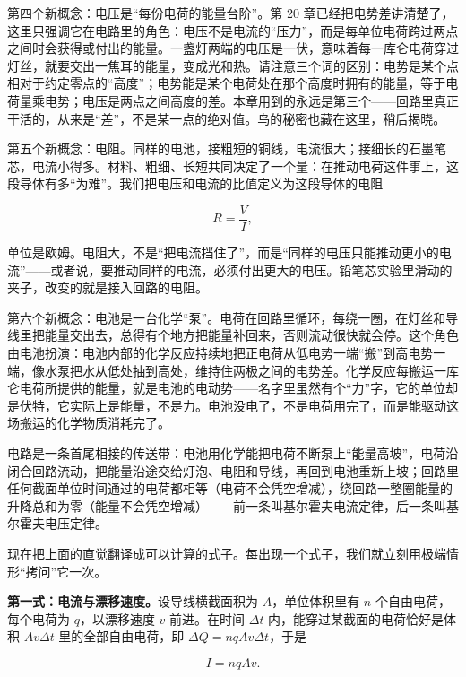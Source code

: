 第四个新概念：电压是“每份电荷的能量台阶”。第 20 章已经把电势差讲清楚了，这里只强调它在电路里的角色：电压不是电流的“压力”，而是每单位电荷跨过两点之间时会获得或付出的能量。一盏灯两端的电压是一伏，意味着每一库仑电荷穿过灯丝，就要交出一焦耳的能量，变成光和热。请注意三个词的区别：电势是某个点相对于约定零点的“高度”；电势能是某个电荷处在那个高度时拥有的能量，等于电荷量乘电势；电压是两点之间高度的差。本章用到的永远是第三个——回路里真正干活的，从来是“差”，不是某一点的绝对值。鸟的秘密也藏在这里，稍后揭晓。

第五个新概念：电阻。同样的电池，接粗短的铜线，电流很大；接细长的石墨笔芯，电流小得多。材料、粗细、长短共同决定了一个量：在推动电荷这件事上，这段导体有多“为难”。我们把电压和电流的比值定义为这段导体的电阻

\[
R=\frac{V}{I},
\]

单位是欧姆。电阻大，不是“把电流挡住了”，而是“同样的电压只能推动更小的电流”——或者说，要推动同样的电流，必须付出更大的电压。铅笔芯实验里滑动的夹子，改变的就是接入回路的电阻。

第六个新概念：电池是一台化学“泵”。电荷在回路里循环，每绕一圈，在灯丝和导线里把能量交出去，总得有个地方把能量补回来，否则流动很快就会停。这个角色由电池扮演：电池内部的化学反应持续地把正电荷从低电势一端“搬”到高电势一端，像水泵把水从低处抽到高处，维持住两极之间的电势差。化学反应每搬运一库仑电荷所提供的能量，就是电池的电动势——名字里虽然有个“力”字，它的单位却是伏特，它实际上是能量，不是力。电池没电了，不是电荷用完了，而是能驱动这场搬运的化学物质消耗完了。


\begin{oneline}
电路是一条首尾相接的传送带：电池用化学能把电荷不断泵上“能量高坡”，电荷沿闭合回路流动，把能量沿途交给灯泡、电阻和导线，再回到电池重新上坡；回路里任何截面单位时间通过的电荷都相等（电荷不会凭空增减），绕回路一整圈能量的升降总和为零（能量不会凭空增减）——前一条叫基尔霍夫电流定律，后一条叫基尔霍夫电压定律。
\end{oneline}


现在把上面的直觉翻译成可以计算的式子。每出现一个式子，我们就立刻用极端情形“拷问”它一次。

\textbf{第一式：电流与漂移速度。}设导线横截面积为 \(A\)，单位体积里有 \(n\) 个自由电荷，每个电荷为 \(q\)，以漂移速度 \(v\) 前进。在时间 \(\Delta t\) 内，能穿过某截面的电荷恰好是体积 \(Av\Delta t\) 里的全部自由电荷，即 \(\Delta Q=nqAv\Delta t\)，于是

\[
I=nqAv.
\]

